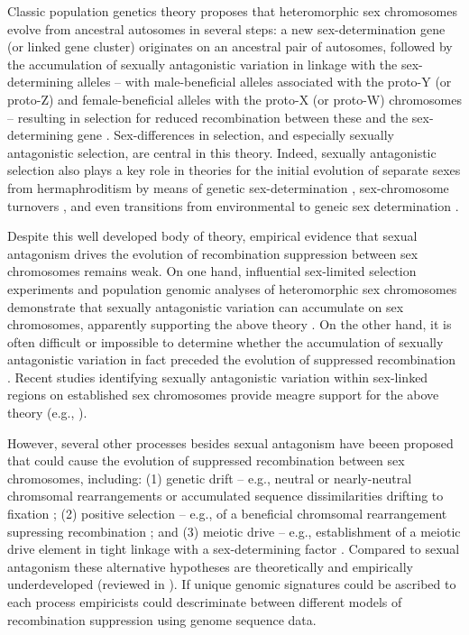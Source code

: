 \documentclass{article}
\begin{document}
Classic population genetics theory proposes that heteromorphic sex chromosomes evolve from ancestral autosomes in several steps: a new sex-determination gene (or linked gene cluster) originates on an ancestral pair of autosomes, followed by the accumulation of sexually antagonistic variation in linkage with the sex-determining alleles -- with male-beneficial alleles associated with the proto-Y (or proto-Z) and female-beneficial alleles with the proto-X (or proto-W) chromosomes -- resulting in selection for reduced recombination between these and the sex-determining gene \citep{Fisher1931, Nei1969, Charlesworth1980, Bull1983, Rice1987, Lenormand2003, CharlesworthMarais2005}. Sex-differences in selection, and especially sexually antagonistic selection, are central in this theory. Indeed, sexually antagonistic selection also plays a key role in theories for the initial evolution of separate sexes from hermaphroditism by means of genetic sex-determination \citep{Charlesworth1978a, Charlesworth1978b, Bull1983, Olito2019}, sex-chromosome turnovers \citep{vanDoornKirkpatrick2007,vanDoornKirkpatrick2010,OttoScottOsmond2018}, and even transitions from environmental to geneic sex determination \citep{MuralidharVeller2018}. 

Despite this well developed body of theory, empirical evidence that sexual antagonism drives the evolution of recombination suppression between sex chromosomes remains weak. On one hand, influential sex-limited selection experiments and population genomic analyses of heteromorphic sex chromosomes demonstrate that sexually antagonistic variation can accumulate on sex chromosomes, apparently supporting the above theory \cite[e.g.,][]{Rice1992,Chippindale2001,Gibson2002, ZhouBachtrog2012,QiuBergeroCharlesworth2013}. On the other hand, it is often difficult or impossible to determine whether the accumulation of sexually antagonistic variation in fact preceded the evolution of suppressed recombination \citep{Charlesworth1980, Rice1984, Ironside2010, Ponnikas2018}. Recent studies identifying sexually antagonistic variation within sex-linked regions on established sex chromosomes provide meagre support for the above theory (e.g., \citealt{BergeroCharlesworth2009,QiuBergeroCharlesworth2013,KirkpatrickGuerrero2014, Wright2017, Bergero2019}).

However, several other processes besides sexual antagonism have beeen proposed that could cause the evolution of suppressed recombination between sex chromosomes, including: (1) genetic drift -- e.g., neutral or nearly-neutral chromsomal rearrangements or accumulated sequence dissimilarities drifting to fixation \citep{CharlesworthMarais2005}; (2) positive selection -- e.g., of a beneficial chromsomal rearrangement supressing recombination \citep{Haldane1957}; and (3) meiotic drive -- e.g., establishment of a meiotic drive element in tight linkage with a sex-determining factor \citep{UbedaPatten2010}. Compared to sexual antagonism these alternative hypotheses are theoretically and empirically underdeveloped (reviewed in \citealt{Ironside2010, Ponnikas2018}). If unique genomic signatures could be ascribed to each process empiricists could descriminate between different models of recombination suppression using genome sequence data. 
\end{document}
